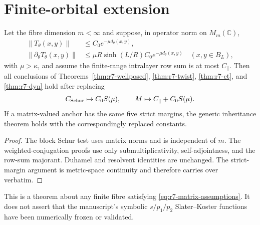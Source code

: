 \section{Finite-orbital extension}
\label{sec:r7-multiorbital}

\begin{theorem}
\label{thm:r7-matrix}
Let the fibre dimension $m<\infty$ and suppose, in operator norm on
$M_m(\mathbb C)$,
\begin{align}
 \|T_\theta(x,y)\|&\le C_0e^{-\mu d_\theta(x,y)},\\
 \|\partial_\theta T_\theta(x,y)\|&\le
 \mu R\sinh(L/R)C_0e^{-\mu d_\theta(x,y)}
 \quad (x,y\in B_L),
 \label{eq:r7-matrix-assumptions}
\end{align}
with $\mu>\kappa$, and assume the finite-range intralayer row sum is at most
$C_\parallel$.  Then all conclusions of
Theorems~\ref{thm:r7-wellposed}, \ref{thm:r7-twist},
\ref{thm:r7-ct}, and \ref{thm:r7-dyn} hold after replacing
\begin{equation}
 C_{\rm Schur}\mapsto C_0S(\mu),\qquad
 M\mapsto C_\parallel+C_0S(\mu).
\end{equation}
If a matrix-valued anchor has the same five strict margins, the generic
inheritance theorem holds with the correspondingly replaced constants.
\end{theorem}

\begin{proof}
The block Schur test uses matrix norms and is independent of $m$.  The
weighted-conjugation proofs use only submultiplicativity, self-adjointness,
and the row-sum majorant.  Duhamel and resolvent identities are unchanged.
The strict-margin argument is metric-space continuity and therefore carries
over verbatim.
\end{proof}

This is a theorem about any finite fibre satisfying
\eqref{eq:r7-matrix-assumptions}.  It does not assert that the manuscript's
symbolic $s/p_1/p_2$ Slater--Koster functions have been numerically frozen or
validated.
